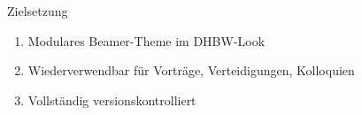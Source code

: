 \begin{frame}{Zielsetzung}
  \begin{enumerate}
    \item Modulares Beamer-Theme im DHBW-Look
    \item Wiederverwendbar für Vorträge, Verteidigungen, Kolloquien
    \item Vollständig versionskontrolliert
  \end{enumerate}
\end{frame}